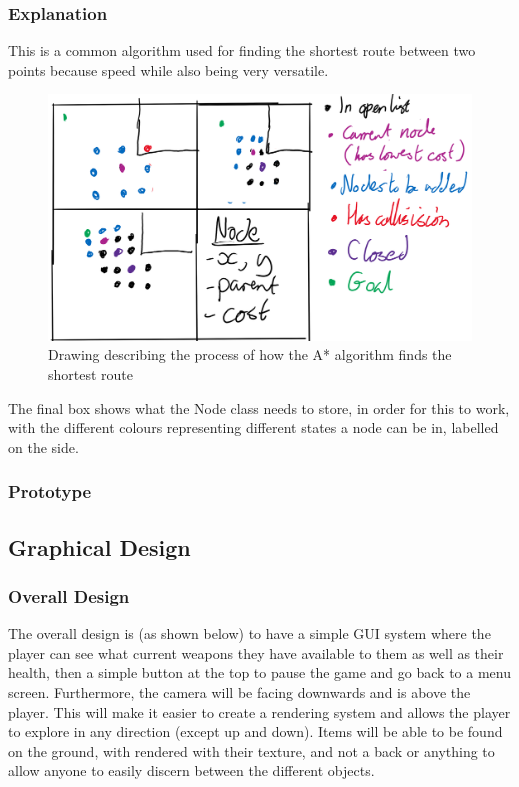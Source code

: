 \documentclass{article}
\begin{document}
            \subsubsection{Explanation}
                This is a common algorithm used for finding the shortest route between two points because speed while also being very versatile.
                \begin{figure}[hbt!]
                    \centerline{\includegraphics[scale=0.3]{img/Design/A-star algorithm.png}}
                    \caption{Drawing describing the process of how the A* algorithm finds the shortest route}
                    \label{fig}
                \end{figure}

                The final box shows what the Node class needs to store, in order for this to work, with the different colours representing different states a node can be in, labelled on the side.
            \subsubsection{Prototype} %

        \subsection{Graphical Design}
            \subsubsection{Overall Design}
                The overall design is (as shown below) to have a simple GUI system where the player can see what current weapons they have available to them as well as their health, then a simple button at the top to pause the game and go back to a menu screen. Furthermore, the camera will be facing downwards and is above the player. This will make it easier to create a rendering system and allows the player to explore in any direction (except up and down). Items will be able to be found on the ground, with rendered with their texture, and not a back or anything to allow anyone to easily discern between the different objects.
\end{document}
